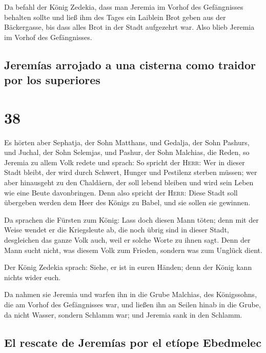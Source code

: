  Da befahl der König Zedekia, dass man Jeremia im Vorhof
des Gefängnisses behalten sollte und ließ ihm des Tages ein Laiblein
Brot geben aus der Bäckergasse, bis dass alles Brot in der Stadt
aufgezehrt war. Also blieb Jeremia im Vorhof des Gefängnisses.

\hypertarget{jeremuxedas-arrojado-a-una-cisterna-como-traidor-por-los-superiores}{%
\subsection{Jeremías arrojado a una cisterna como traidor por los
superiores}\label{jeremuxedas-arrojado-a-una-cisterna-como-traidor-por-los-superiores}}

\hypertarget{section-37}{%
\section{38}\label{section-37}}

 Es hörten aber Sephatja, der Sohn Matthans, und Gedalja,
der Sohn Pashurs, und Juchal, der Sohn Selemjas, und Pashur, der Sohn
Malchias, die Reden, so Jeremia zu allem Volk redete und sprach:
 So spricht der \textsc{Herr}: Wer in dieser Stadt bleibt,
der wird durch Schwert, Hunger und Pestilenz sterben müssen; wer aber
hinausgeht zu den Chaldäern, der soll lebend bleiben und wird sein Leben
wie eine Beute davonbringen.  Denn also spricht der
\textsc{Herr}: Diese Stadt soll übergeben werden dem Heer des Königs zu
Babel, und sie sollen sie gewinnen.

 Da sprachen die Fürsten zum König: Lass doch diesen Mann
töten; denn mit der Weise wendet er die Kriegsleute ab, die noch übrig
sind in dieser Stadt, desgleichen das ganze Volk auch, weil er solche
Worte zu ihnen sagt. Denn der Mann sucht nicht, was diesem Volk zum
Frieden, sondern was zum Unglück dient.

 Der König Zedekia sprach: Siehe, er ist in euren Händen;
denn der König kann nichts wider euch.

 Da nahmen sie Jeremia und warfen ihn in die Grube
Malchias, des Königssohns, die am Vorhof des Gefängnisses war, und
ließen ihn an Seilen hinab in die Grube, da nicht Wasser, sondern
Schlamm war; und Jeremia sank in den Schlamm.

\hypertarget{el-rescate-de-jeremuxedas-por-el-etuxedope-ebedmelec}{%
\subsection{El rescate de Jeremías por el etíope
Ebedmelec}\label{el-rescate-de-jeremuxedas-por-el-etuxedope-ebedmelec}}

